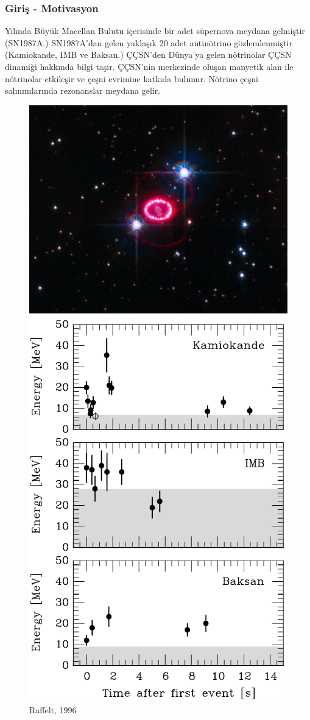 \documentclass[10pt]{beamer}
\begin{document}
\begin{frame}
    \frametitle{Giriş - Motivasyon}
        \begin{minipage}{0.45\textwidth}
            \footnotesize
            \begin{outline}
                 Yılında Büyük Macellan Bulutu içerisinde bir adet süpernova meydana gelmiştir (SN1987A.)
                \1[\textbullet] SN1987A'dan gelen yaklaşık 20 adet antinötrino gözlemlenmiştir (Kamiokande, IMB ve Baksan.)
                \1[\textbullet] ÇÇSN'den Dünya'ya gelen nötrinolar ÇÇSN dinamiği hakkında bilgi taşır.
                \1[\textbullet] ÇÇSN'nin merkezinde oluşan manyetik alan ile nötrinolar etkileşir ve çeşni evrimine katkıda bulunur.
                \1[\textbullet] Nötrino çeşni salınımlarında rezonanslar meydana gelir.
            \end{outline}
            \normalsize
        \end{minipage}
        \hfill
        \begin{minipage}{0.45\textwidth}
            \begin{figure}[hbt!]
                \centering
                \includegraphics[width=.4\textwidth]{fig/SN1987A.jpg}
                \includegraphics[width=.7\textwidth]{fig/SN1987A_neutrino.png}
                {\tiny Raffelt, 1996}
            \end{figure}
            
        \end{minipage}
\end{frame}
\end{document}
